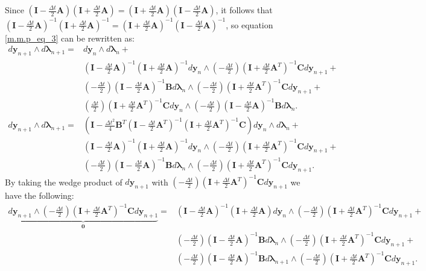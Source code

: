 \documentclass[a4paper, 10pt]{article}
\begin{document}
Since $(\bm{I} - \tfrac{\Delta{t}}{2}\bm{A})(\bm{I} + \tfrac{\Delta{t}}{2}\bm{A}) = (\bm{I} + \tfrac{\Delta{t}}{2}\bm{A})(\bm{I} - \tfrac{\Delta{t}}{2}\bm{A})$, it follows that $(\bm{I} - \tfrac{\Delta{t}}{2}\bm{A})^{-1}(\bm{I} + \tfrac{\Delta{t}}{2}\bm{A})^{-1} = (\bm{I} + \tfrac{\Delta{t}}{2}\bm{A})^{-1}(\bm{I} - \tfrac{\Delta{t}}{2}\bm{A})^{-1}$, so equation \eqref{m.m.p_eq_3} can be rewritten as:
\begin{align}
     d\bm{y}_{n+1} \wedge d\bm{\lambda}_{n+1} = &  d\bm{y}_{n} \wedge d\bm{\lambda}_{n} + \nonumber \\
    & (\bm{I}-\tfrac{\Delta{t}}{2}\bm{A})^{-1} (\bm{I}+\tfrac{\Delta{t}}{2}\bm{A})^{-1} d\bm{y}_{n} \wedge (-\tfrac{\Delta{t}}{2})(\bm{I}+\tfrac{\Delta{t}}{2}\bm{A}^{T})^{-1}\bm{C} d\bm{y}_{n+1} + \nonumber \\
    & (-\tfrac{\Delta{t}}{2})(\bm{I}-\tfrac{\Delta{t}}{2}\bm{A})^{-1}\bm{B} d\bm{\lambda}_{n} \wedge (-\tfrac{\Delta{t}}{2})(\bm{I}+\tfrac{\Delta{t}}{2}\bm{A}^{T})^{-1}\bm{C} d\bm{y}_{n+1} + \nonumber \\
    & (\tfrac{\Delta{t}}{2})(\bm{I}+\tfrac{\Delta{t}}{2}\bm{A}^{T})^{-1}\bm{C} d\bm{y}_{n} \wedge (-\tfrac{\Delta{t}}{2})(\bm{I}-\tfrac{\Delta{t}}{2}\bm{A})^{-1}\bm{B} d\bm{\lambda}_{n}. \label{m.m.p_eq_4}
\end{align}
\begin{align}
     d\bm{y}_{n+1} \wedge d\bm{\lambda}_{n+1} = & \left(\bm{I}-\tfrac{\Delta{t}^2}{4}\bm{B}^{T}(\bm{I}-\tfrac{\Delta{t}}{2}\bm{A}^{T})^{-1}(\bm{I}+\tfrac{\Delta{t}}{2}\bm{A}^{T})^{-1}\bm{C}\right) d\bm{y}_{n} \wedge d\bm{\lambda}_{n}  + \nonumber \\
     & (\bm{I}-\tfrac{\Delta{t}}{2}\bm{A})^{-1} (\bm{I}+\tfrac{\Delta{t}}{2}\bm{A})^{-1} d\bm{y}_{n} \wedge (-\tfrac{\Delta{t}}{2})(\bm{I}+\tfrac{\Delta{t}}{2}\bm{A}^{T})^{-1}\bm{C} d\bm{y}_{n+1} + \nonumber \\
    & (-\tfrac{\Delta{t}}{2})(\bm{I}-\tfrac{\Delta{t}}{2}\bm{A})^{-1}\bm{B} d\bm{\lambda}_{n} \wedge (-\tfrac{\Delta{t}}{2})(\bm{I}+\tfrac{\Delta{t}}{2}\bm{A}^{T})^{-1}\bm{C} d\bm{y}_{n+1}. \label{m.m.p_eq_5}
\end{align}
By taking the wedge product of $d\bm{y}_{n+1}$ with $(-\tfrac{\Delta{t}}{2})(\bm{I}+\tfrac{\Delta{t}}{2}\bm{A}^{T})^{-1}\bm{C}d\bm{y}_{n+1}$ we have the following:
\begin{align}
   \underbrace{d\bm{y}_{n+1} \wedge  (-\tfrac{\Delta{t}}{2})(\bm{I}+\tfrac{\Delta{t}}{2}\bm{A}^{T})^{-1}\bm{C}d\bm{y}_{n+1}}_{\bm{0}} = & (\bm{I}-\tfrac{\Delta{t}}{2}\bm{A})^{-1}(\bm{I}+\tfrac{\Delta{t}}{2}\bm{A})d\bm{y}_{n} \wedge (-\tfrac{\Delta{t}}{2})(\bm{I}+\tfrac{\Delta{t}}{2}\bm{A}^{T})^{-1}\bm{C}d\bm{y}_{n+1} +\nonumber \\
   & (-\tfrac{\Delta{t}}{2})(\bm{I}-\tfrac{\Delta{t}}{2}\bm{A})^{-1}\bm{B}d\bm{\lambda}_{n} \wedge (-\tfrac{\Delta{t}}{2})(\bm{I}+\tfrac{\Delta{t}}{2}\bm{A}^{T})^{-1}\bm{C}d\bm{y}_{n+1}  + \nonumber \\
   & (-\tfrac{\Delta{t}}{2})(\bm{I}-\tfrac{\Delta{t}}{2}\bm{A})^{-1}\bm{B}d\bm{\lambda}_{n+1} \wedge (-\tfrac{\Delta{t}}{2})(\bm{I}+\tfrac{\Delta{t}}{2}\bm{A}^{T})^{-1}\bm{C}d\bm{y}_{n+1}. \label{m.m.p_eq_6}
\end{align}
\end{document}
